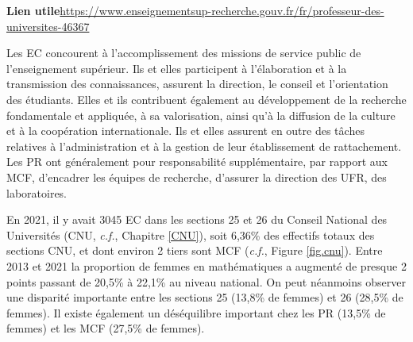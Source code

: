 \textbf{Lien utile\hspace{.5em}}\url{https://www.enseignementsup-recherche.gouv.fr/fr/professeur-des-universites-46367}
 
Les EC concourent \`a l'accomplissement des missions de service
public de l'enseignement sup\'erieur. Ils et elles participent \`a
l'\'elaboration et \`a la transmission des connaissances, assurent
la direction, le conseil et l'orientation des \'etudiants. Elles et ils
contribuent \'egalement au d\'eveloppement de la recherche
fondamentale et appliqu\'ee, \`a sa valorisation, ainsi qu'\`a la
diffusion de la culture et \`a la coop\'eration internationale. Ils et elles
assurent en outre des t\^aches relatives \`a l'administration et \`a
la gestion de leur \'etablissement de rattachement. Les PR ont g\'en\'eralement pour responsabilit\'e suppl\'ementaire, par
rapport aux MCF, d'encadrer les \'equipes de
recherche, d'assurer la direction des UFR, des laboratoires.


En 2021, il y avait 3045 EC dans les sections 25 et 26 du Conseil National des Universit\'es (CNU, \textit{c.f.}, Chapitre \ref{CNU}), soit 6,36\% des effectifs totaux des sections CNU, et dont environ 2 tiers sont MCF (\textit{c.f.}, Figure \ref{fig.cnu}). Entre 2013 et 2021 la proportion de femmes en math\'ematiques a augment\'e de presque 2 points passant de 20,5\% \`a 22,1\% au niveau national. On peut n\'eanmoins observer une disparit\'e importante entre les sections 25 (13,8\% de femmes) et 26 (28,5\% de femmes). Il existe \'egalement un d\'es\'equilibre important chez les PR (13,5\% de femmes) et les MCF (27,5\% de femmes).

